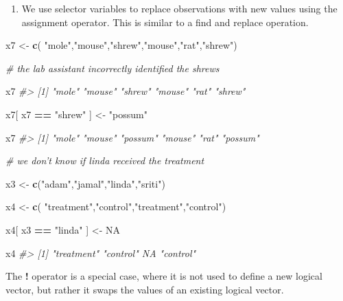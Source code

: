 \documentclass[]{book}
\newenvironment{Shaded}{\begin{snugshade}}{\end{snugshade}}
\newcommand{\CommentTok}[1]{\textcolor[rgb]{0.56,0.35,0.01}{\textit{#1}}}
\newcommand{\KeywordTok}[1]{\textcolor[rgb]{0.13,0.29,0.53}{\textbf{#1}}}
\newcommand{\NormalTok}[1]{#1}
\newcommand{\OperatorTok}[1]{\textcolor[rgb]{0.81,0.36,0.00}{\textbf{#1}}}
\newcommand{\OtherTok}[1]{\textcolor[rgb]{0.56,0.35,0.01}{#1}}
\newcommand{\StringTok}[1]{\textcolor[rgb]{0.31,0.60,0.02}{#1}}
\providecommand{\tightlist}{%
  \setlength{\itemsep}{0pt}\setlength{\parskip}{0pt}}
\theoremstyle{definition}
\theoremstyle{definition}
\theoremstyle{definition}
\theoremstyle{remark}
\begin{document}
\begin{enumerate}
\def\labelenumi{(\arabic{enumi})}
\setcounter{enumi}{2}
\tightlist
\item
  We use selector variables to replace observations with new values
  using the assignment operator. This is similar to a find and replace
  operation.
\end{enumerate}

\begin{Shaded}
\begin{Highlighting}[]

\NormalTok{x7 <-}\StringTok{ }\KeywordTok{c}\NormalTok{( }\StringTok{"mole"}\NormalTok{,}\StringTok{"mouse"}\NormalTok{,}\StringTok{"shrew"}\NormalTok{,}\StringTok{"mouse"}\NormalTok{,}\StringTok{"rat"}\NormalTok{,}\StringTok{"shrew"}\NormalTok{)}

\CommentTok{# the lab assistant incorrectly identified the shrews}

\NormalTok{x7}
\CommentTok{#> [1] "mole"  "mouse" "shrew" "mouse" "rat"   "shrew"}

\NormalTok{x7[ x7 }\OperatorTok{==}\StringTok{ "shrew"}\NormalTok{ ] <-}\StringTok{ "possum"}

\NormalTok{x7}
\CommentTok{#> [1] "mole"   "mouse"  "possum" "mouse"  "rat"    "possum"}


\CommentTok{# we don't know if linda received the treatment}

\NormalTok{x3 <-}\StringTok{ }\KeywordTok{c}\NormalTok{(}\StringTok{"adam"}\NormalTok{,}\StringTok{"jamal"}\NormalTok{,}\StringTok{"linda"}\NormalTok{,}\StringTok{"sriti"}\NormalTok{)}

\NormalTok{x4 <-}\StringTok{ }\KeywordTok{c}\NormalTok{( }\StringTok{"treatment"}\NormalTok{,}\StringTok{"control"}\NormalTok{,}\StringTok{"treatment"}\NormalTok{,}\StringTok{"control"}\NormalTok{)}

\NormalTok{x4[ x3 }\OperatorTok{==}\StringTok{ "linda"}\NormalTok{ ] <-}\StringTok{ }\OtherTok{NA}

\NormalTok{x4}
\CommentTok{#> [1] "treatment" "control"   NA          "control"}
\end{Highlighting}
\end{Shaded}

The \textbf{!} operator is a special case, where it is not used to
define a new logical vector, but rather it swaps the values of an
existing logical vector.
\end{document}
